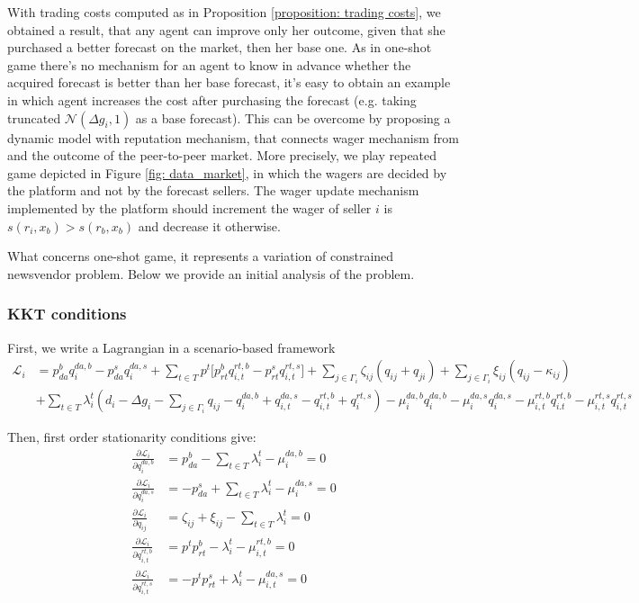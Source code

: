 \documentclass{article}
\begin{document}
With trading costs computed as in Proposition \ref{proposition: trading costs}, we obtained a result, that any agent can improve only her outcome, given that she purchased a better forecast on the market, then her base one. As in one-shot game there's no mechanism for an agent to know in advance whether the acquired forecast is better than her base forecast, it's easy to obtain an example in which agent increases the cost after purchasing the forecast (e.g. taking truncated $\mathcal{N}(\Delta g_i, 1)$ as a base forecast). This can be overcome by proposing a dynamic model with reputation mechanism, that connects wager mechanism from \cite{raja} and the outcome of the peer-to-peer market. More precisely, we play repeated game depicted in Figure \ref{fig: data_market}, in which the wagers are decided by the platform and not by the forecast sellers. The wager update mechanism implemented by the platform should increment the wager of seller $i$ is $s(r_i, x_b) > s(r_b, x_b)$ and decrease it otherwise. 

What concerns one-shot game, it represents a variation of constrained newsvendor problem. Below we provide an initial analysis of the problem.

\subsubsection{KKT conditions}
First, we write a Lagrangian in a scenario-based framework
\begin{equation}
    \begin{aligned}
        \mathcal{L}_i &= p^b_{da} q^{da,b}_i - p^s_{da} q^{da, s}_i + \sum_{t \in T} p^t \big[ p^b_{rt} q^{rt,b}_{i,t} - p^s_{rt} q^{rt, s}_{i, t} \big] + \sum_{j \in \Gamma_i} \zeta_{ij} (q_{ij} + q_{ji}) + \sum_{j \in \Gamma_i} \xi_{ij} (q_{ij} - \kappa_{ij}) \\
        &+ \sum_{t \in T} \lambda^t_i (d_i - \Delta g_i - \sum_{j \in \Gamma_i} q_{ij} - q^{da,b}_i + q^{da,s}_{i,t} - q^{rt,b}_{i,t} + q^{rt,s}_i) - \mu^{da, b}_i q^{da, b}_i - \mu^{da,s}_i q^{da,s}_i - \mu^{rt,b}_{i,t} q^{rt,b}_{i.t} - \mu^{rt, s}_{i,t} q^{rt,s}_{i,t}
    \end{aligned}
\end{equation}

Then, first order stationarity conditions give:
\begin{align}
    \frac{\partial \mathcal{L}_i}{\partial q^{da, b}_i} &= p^b_{da} - \sum_{t \in T} \lambda^t_i - \mu^{da,b}_i = 0 \\
    \frac{\partial \mathcal{L}_i}{\partial q^{da, s}_i} &= -p^s_{da} + \sum_{t \in T} \lambda^t_i - \mu^{da,s}_i = 0 \\
    \frac{\partial \mathcal{L}_i}{\partial q_{ij}} &= \zeta_{ij} + \xi_{ij} - \sum_{t \in T} \lambda^t_i = 0 \\
    \frac{\partial \mathcal{L}_i}{\partial q^{rt, b}_{i,t}} &= p^t p^b_{rt} -  \lambda^t_i - \mu^{rt,b}_{i,t} = 0 \\
    \frac{\partial \mathcal{L}_i}{\partial q^{rt, s}_{i,t}} &= - p^t p^s_{rt} +  \lambda^t_i - \mu^{da,s}_{i,t} = 0 
\end{align}
\end{document}
